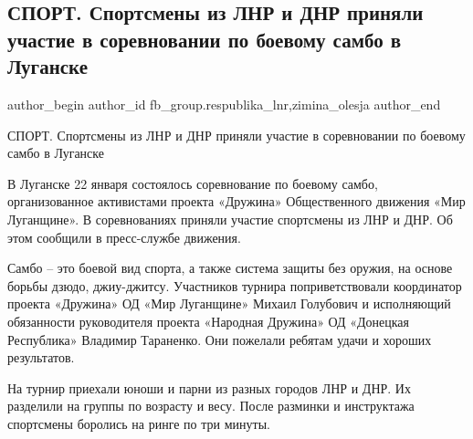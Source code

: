  
 
 
 
 
 
\subsection{СПОРТ. Спортсмены из ЛНР и ДНР приняли участие в соревновании по боевому самбо в Луганске}
\label{sec:23_01_2022.fb.fb_group.respublika_lnr.1.sorev_sambo_lugansk}
 
\ifcmt
 author_begin
   author_id fb_group.respublika_lnr,zimina_olesja
 author_end
\fi

СПОРТ. Спортсмены из ЛНР и ДНР приняли участие в соревновании по боевому самбо
в Луганске

В Луганске 22 января состоялось соревнование по боевому самбо, организованное
активистами проекта «Дружина» Общественного движения «Мир Луганщине». В
соревнованиях приняли участие спортсмены из ЛНР и ДНР. Об этом сообщили в
пресс-службе движения.


Самбо –  это боевой вид спорта, а также система защиты без оружия, на основе
борьбы дзюдо, джиу-джитсу. Участников турнира поприветствовали координатор
проекта «Дружина» ОД «Мир Луганщине» Михаил Голубович и исполняющий обязанности
руководителя проекта «Народная Дружина» ОД «Донецкая Республика» Владимир
Тараненко. Они пожелали ребятам удачи и хороших результатов.


На турнир приехали юноши и парни из разных городов ЛНР и ДНР. Их разделили на
группы по возрасту и весу. После разминки и инструктажа спортсмены боролись на
ринге по три минуты.


